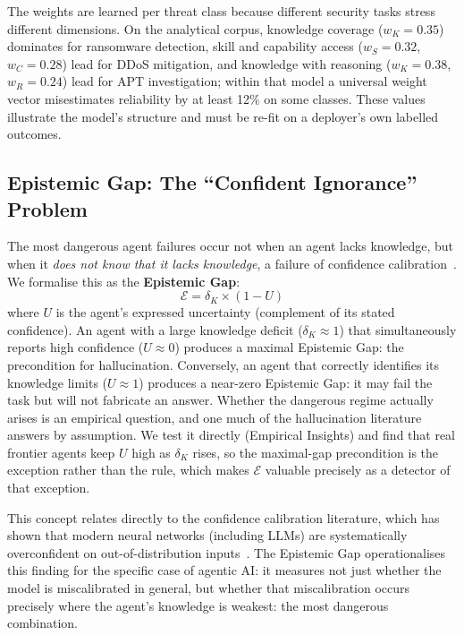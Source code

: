 \documentclass[journal,compsoc]{IEEEtran}
\begin{document}
The weights are learned per threat class because different security tasks
stress different dimensions. On the analytical corpus, knowledge coverage
($w_K = 0.35$) dominates for ransomware detection, skill and capability
access ($w_S = 0.32$, $w_C = 0.28$) lead for DDoS mitigation, and knowledge
with reasoning ($w_K = 0.38$, $w_R = 0.24$) lead for APT investigation;
within that model a universal weight vector misestimates reliability by at
least 12\% on some classes. These values illustrate the model's structure
and must be re-fit on a deployer's own labelled outcomes.

\subsection{Epistemic Gap: The ``Confident Ignorance'' Problem}

The most dangerous agent failures occur not when an agent lacks knowledge,
but when it \textit{does not know that it lacks knowledge}, a failure of
confidence calibration~\cite{guo2017calibration}. We formalise this as the
\textbf{Epistemic Gap}:
\[
  \mathcal{E} = \delta_K \times (1 - U)
\]
where $U$ is the agent's expressed uncertainty (complement of its stated
confidence). An agent with a large knowledge deficit ($\delta_K \approx 1$)
that simultaneously reports high confidence ($U \approx 0$) produces a
maximal Epistemic Gap: the precondition for hallucination. Conversely, an
agent that correctly identifies its knowledge limits ($U \approx 1$) produces
a near-zero Epistemic Gap: it may fail the task but will not fabricate
an answer. Whether the dangerous regime actually arises is an empirical
question, and one much of the hallucination literature answers by
assumption. We test it directly (Empirical Insights) and find that real
frontier agents keep $U$ high as $\delta_K$ rises, so the maximal-gap
precondition is the exception rather than the rule, which makes
$\mathcal{E}$ valuable precisely as a detector of that exception.

This concept relates directly to the confidence calibration literature, which
has shown that modern neural networks (including LLMs) are systematically
overconfident on out-of-distribution inputs~\cite{guo2017calibration}. The
Epistemic Gap operationalises this finding for the specific case of agentic
AI: it measures not just whether the model is miscalibrated in general, but
whether that miscalibration occurs precisely where the agent's knowledge is
weakest: the most dangerous combination.
\end{document}
